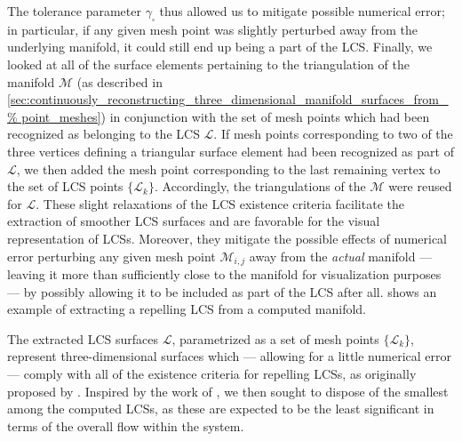 The tolerance parameter $\gamma_{\square}$ thus allowed us to mitigate possible
numerical error; in particular, if any given mesh point was slightly perturbed
away from the underlying manifold, it could still end up being a part of the
LCS. Finally, we looked at all of the surface elements pertaining to the
triangulation of the manifold $\mathcal{M}$ (as described in
\cref{sec:continuously_reconstructing_three_dimensional_manifold_surfaces_from_%
point_meshes}) in conjunction with the set of mesh points which had been
recognized as belonging to the LCS $\mathcal{L}$. If mesh points corresponding
to two of the three vertices defining a triangular surface element had been
recognized as part of $\mathcal{L}$, we then added the mesh point corresponding
to the last remaining vertex to the set of LCS points $\{\mathcal{L}_{k}\}$.
Accordingly, the triangulations of the $\mathcal{M}$ were reused for
$\mathcal{L}$. These slight relaxations of the LCS existence criteria
facilitate the extraction of smoother LCS surfaces and are favorable for the
visual representation of LCSs. Moreover, they mitigate the possible effects of
numerical error perturbing any given mesh point $\mathcal{M}_{i,j}$ away from
the \emph{actual} manifold --- leaving it more than sufficiently close to the
manifold for visualization purposes --- by possibly allowing it to be included
as part of the LCS after all.  shows an
example of extracting a repelling LCS from a computed manifold.



The extracted LCS surfaces $\mathcal{L}$, parametrized as a set of mesh points
$\{\mathcal{L}_{k}\}$, represent three-dimensional surfaces which --- allowing
for a little numerical error --- comply with all of the existence criteria
for repelling LCSs, as originally proposed by \textcite{haller2011variational}.
Inspired by the work of \textcite{farazmand2012computing}, we then sought to
dispose of the smallest among the computed LCSs, as these are expected to
be the least significant in terms of the overall flow within the system.

